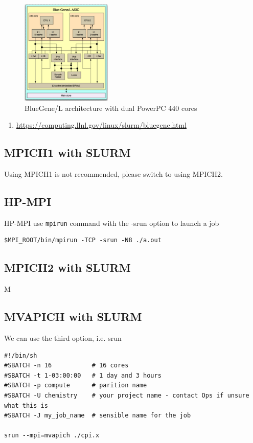 \begin{figure}[hbt]
  \centerline{\includegraphics[height=5cm,
    angle=0]{./images/BlueGene_L.eps}}
  \caption{BlueGene/L architecture with dual PowerPC 440 cores}
  \label{fig:BlueGene_L}
\end{figure}


\begin{enumerate}
  \item \url{https://computing.llnl.gov/linux/slurm/bluegene.html}
\end{enumerate}

\subsection{MPICH1 with SLURM}

Using MPICH1 is not recommended, please switch to using MPICH2.

\subsection{HP-MPI}

HP-MPI use \verb!mpirun! command with the -srun option to launch a job
\begin{verbatim}
$MPI_ROOT/bin/mpirun -TCP -srun -N8 ./a.out
\end{verbatim}


\subsection{MPICH2 with SLURM}

M


\subsection{MVAPICH with SLURM}

We can use the third option, i.e. srun 
\begin{verbatim}
#!/bin/sh
#SBATCH -n 16           # 16 cores
#SBATCH -t 1-03:00:00   # 1 day and 3 hours
#SBATCH -p compute      # parition name
#SBATCH -U chemistry    # your project name - contact Ops if unsure what this is
#SBATCH -J my_job_name  # sensible name for the job

srun --mpi=mvapich ./cpi.x
\end{verbatim}

